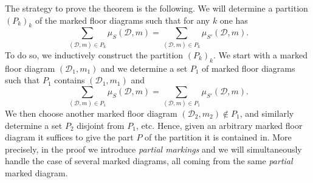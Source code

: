 \documentclass[11pt]{article}
\theoremstyle{definition}
\numberwithin{equation}{section}
\newcommand{\D}{\mathcal{D}}
\theoremstyle{plain}
\begin{document}
The strategy to prove the theorem is the following. We will determine a partition $(P_k)_k$ of the marked floor diagrams such that for any $k$ one has
\[ \sum_{(\D,m) \in P_k} \mu_S(\D,m) = \sum_{(\D,m) \in P_k} \mu_{S'}(\D,m). \]
To do so, we inductively construct the partition $(P_k)_k$. We start with a marked floor diagram $(\D_1,m_1)$ and we determine a set $P_1$ of marked floor diagrams such that $P_1$ contains $(\D_1,m_1)$ and
\[ \sum_{(\D,m) \in P_1} \mu_S(\D,m) = \sum_{(\D,m) \in P_1} \mu_{S'}(\D,m). \]
We then choose another marked floor diagram $(\D_2,m_2) \notin P_1$, and similarly determine a set $P_2$ disjoint from $P_1$, etc. Hence, given an arbitrary marked floor diagram it suffices to give the part $P$ of the partition it is contained in.
More precisely, in the proof we introduce \emph{partial markings} and we will simultaneously handle the case of several marked diagrams, all coming from the same \emph{partial} marked diagram. 
\end{document}
